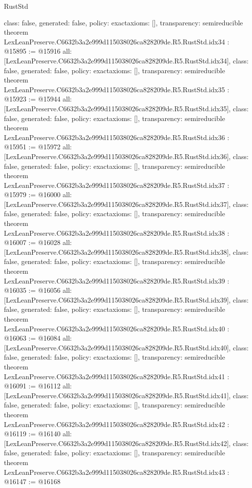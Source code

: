 \begin{lexlean}{RustStd}
\begin{coremodule}
{  class: false,
  generated: false,
  policy: exact{axioms: []},
  transparency: semireducible
}
theorem LexLeanPreserve.C6632b3a2e999d115038026ca828209de.R5.RustStd.idx34 : @15895 := @15916 {
  all: [LexLeanPreserve.C6632b3a2e999d115038026ca828209de.R5.RustStd.idx34],
  class: false,
  generated: false,
  policy: exact{axioms: []},
  transparency: semireducible
}
theorem LexLeanPreserve.C6632b3a2e999d115038026ca828209de.R5.RustStd.idx35 : @15923 := @15944 {
  all: [LexLeanPreserve.C6632b3a2e999d115038026ca828209de.R5.RustStd.idx35],
  class: false,
  generated: false,
  policy: exact{axioms: []},
  transparency: semireducible
}
theorem LexLeanPreserve.C6632b3a2e999d115038026ca828209de.R5.RustStd.idx36 : @15951 := @15972 {
  all: [LexLeanPreserve.C6632b3a2e999d115038026ca828209de.R5.RustStd.idx36],
  class: false,
  generated: false,
  policy: exact{axioms: []},
  transparency: semireducible
}
theorem LexLeanPreserve.C6632b3a2e999d115038026ca828209de.R5.RustStd.idx37 : @15979 := @16000 {
  all: [LexLeanPreserve.C6632b3a2e999d115038026ca828209de.R5.RustStd.idx37],
  class: false,
  generated: false,
  policy: exact{axioms: []},
  transparency: semireducible
}
theorem LexLeanPreserve.C6632b3a2e999d115038026ca828209de.R5.RustStd.idx38 : @16007 := @16028 {
  all: [LexLeanPreserve.C6632b3a2e999d115038026ca828209de.R5.RustStd.idx38],
  class: false,
  generated: false,
  policy: exact{axioms: []},
  transparency: semireducible
}
theorem LexLeanPreserve.C6632b3a2e999d115038026ca828209de.R5.RustStd.idx39 : @16035 := @16056 {
  all: [LexLeanPreserve.C6632b3a2e999d115038026ca828209de.R5.RustStd.idx39],
  class: false,
  generated: false,
  policy: exact{axioms: []},
  transparency: semireducible
}
theorem LexLeanPreserve.C6632b3a2e999d115038026ca828209de.R5.RustStd.idx40 : @16063 := @16084 {
  all: [LexLeanPreserve.C6632b3a2e999d115038026ca828209de.R5.RustStd.idx40],
  class: false,
  generated: false,
  policy: exact{axioms: []},
  transparency: semireducible
}
theorem LexLeanPreserve.C6632b3a2e999d115038026ca828209de.R5.RustStd.idx41 : @16091 := @16112 {
  all: [LexLeanPreserve.C6632b3a2e999d115038026ca828209de.R5.RustStd.idx41],
  class: false,
  generated: false,
  policy: exact{axioms: []},
  transparency: semireducible
}
theorem LexLeanPreserve.C6632b3a2e999d115038026ca828209de.R5.RustStd.idx42 : @16119 := @16140 {
  all: [LexLeanPreserve.C6632b3a2e999d115038026ca828209de.R5.RustStd.idx42],
  class: false,
  generated: false,
  policy: exact{axioms: []},
  transparency: semireducible
}
theorem LexLeanPreserve.C6632b3a2e999d115038026ca828209de.R5.RustStd.idx43 : @16147 := @16168 {
}
\end{coremodule}
\end{lexlean}
